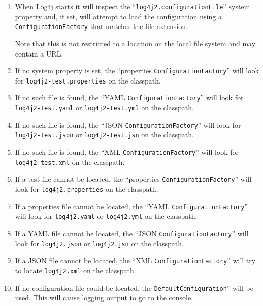 \begin{enumerate}
\item{When Log4j starts it will inspect the “\verb#log4j2.configurationFile#” system property and, if set, will attempt to load the configuration using a \lstinline|ConfigurationFactory| that matches the file extension.

Note that this is not restricted to a location on the local file system and may contain a URL.}

\item{If no system property is set, the “properties \lstinline|ConfigurationFactory|” will look for \verb#log4j2-test.properties# on the classpath.}

\item{If no such file is found, the “YAML \lstinline|ConfigurationFactory|” will look for \verb#log4j2-test.yaml# or \verb#log4j2-test.yml# on the classpath.}

\item{If no such file is found, the “JSON \lstinline|ConfigurationFactory|” will look for \verb#log4j2-test.json# or \verb#log4j2-test.jsn# on the classpath.}

\item{If no such file is found, the “XML \lstinline|ConfigurationFactory|” will look for \verb#log4j2-test.xml# on the classpath.}

\item{If a test file cannot be located, the “properties \lstinline|ConfigurationFactory|” will look for \verb#log4j2.properties# on the classpath.}

\item{If a properties file cannot be located, the “YAML \lstinline|ConfigurationFactory|” will look for \verb#log4j2.yaml# or \verb#log4j2.yml# on the classpath.}

\item{If a YAML file cannot be located, the “JSON \lstinline|ConfigurationFactory|” will look for \verb#log4j2.json# or \verb#log4j2.jsn# on the classpath.}

\item{If a JSON file cannot be located, the “XML \lstinline|ConfigurationFactory|” will try to locate \verb#log4j2.xml# on the classpath.}

\item{If no configuration file could be located, the \lstinline|DefaultConfiguration|” will be used. This will cause logging output to go to the console.}
\end{enumerate}

